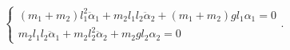 \documentclass{article}[a4paper]
\begin{document}
$$
	\left\{ {\begin{array}{*{20}{l}}
{\left( {{m_1} + {m_2}} \right)l_1^2{{\ddot \alpha }_1} + {m_2}{l_1}{l_2}{{\ddot \alpha }_2} + \left( {{m_1} + {m_2}} \right)g{l_1}{\alpha _1} = 0}\\[0.4em]
{{m_2}{l_1}{l_2}{{\ddot \alpha }_1} + {m_2}l_2^2{{\ddot \alpha }_2} + {m_2}g{l_2}{\alpha _2} = 0}
\end{array}.} \right.$$
\end{document}

